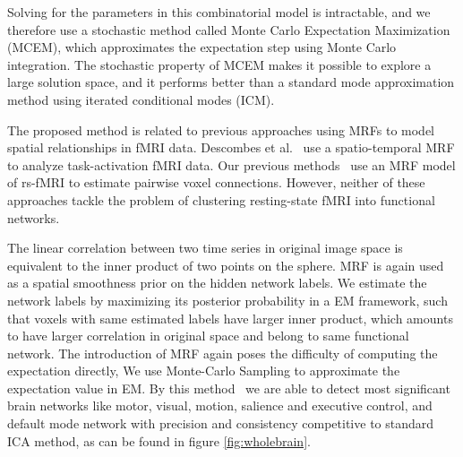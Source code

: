\documentclass[12pt]{article}
\begin{document}
Solving for the parameters in this combinatorial model is intractable, and we
therefore use a stochastic method called Monte Carlo Expectation Maximization
(MCEM), which approximates the expectation step using Monte Carlo
integration. The stochastic property of MCEM makes it possible to explore a
large solution space, and it performs better than a standard mode approximation
method using iterated conditional modes (ICM).

The proposed method is related to previous approaches using MRFs to model
spatial relationships in fMRI data. Descombes et
al.~\cite{descombes_spatio-temporal_1998} use a spatio-temporal MRF to analyze
task-activation fMRI data. Our previous methods~\cite{liu2010spatialCopy} use an MRF
model of rs-fMRI to estimate pairwise voxel connections. However, neither of
these approaches tackle the problem of clustering resting-state fMRI into
functional networks.

The linear correlation between two time series in original image space is
equivalent to the inner product of two points on the sphere.  MRF is again used
as a spatial smoothness prior on the hidden network labels. We estimate the
network labels by maximizing its posterior probability in a EM framework, such
that voxels with same estimated labels have larger inner product, which amounts
to have larger correlation in original space and belong to same functional
network. The introduction of MRF again poses the difficulty of computing the
expectation directly, We use Monte-Carlo Sampling to approximate the expectation
value in EM. By this method~\cite{liu2011monteCopy} we are able to detect most
significant brain networks like motor, visual, motion, salience and executive
control, and default mode network with precision and consistency competitive to
standard ICA method, as can be found in figure \ref{fig:wholebrain}.
\end{document}
